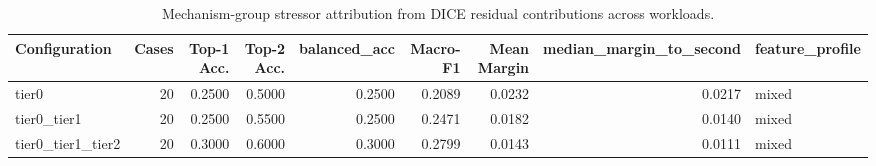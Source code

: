 \begin{table}[t]
\centering
\caption{Mechanism-group stressor attribution from DICE residual contributions across workloads.}
\label{tab:dice_stressor_diagnosis}
\footnotesize
\begin{tabular}{lrrrrrrrl}
\toprule
Configuration & Cases & Top-1 Acc. & Top-2 Acc. & balanced_acc & Macro-F1 & Mean Margin & median_margin_to_second & feature_profile \\
\midrule
tier0 & 20 & 0.2500 & 0.5000 & 0.2500 & 0.2089 & 0.0232 & 0.0217 & mixed \\
tier0_tier1 & 20 & 0.2500 & 0.5500 & 0.2500 & 0.2471 & 0.0182 & 0.0140 & mixed \\
tier0_tier1_tier2 & 20 & 0.3000 & 0.6000 & 0.3000 & 0.2799 & 0.0143 & 0.0111 & mixed \\
\bottomrule
\end{tabular}

\end{table}
